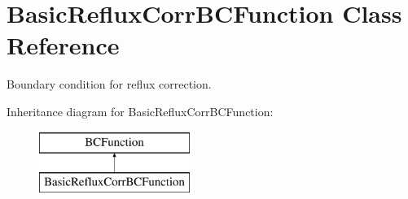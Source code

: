\hypertarget{class_basic_reflux_corr_b_c_function}{\section{Basic\-Reflux\-Corr\-B\-C\-Function Class Reference}
\label{class_basic_reflux_corr_b_c_function}
}


Boundary condition for reflux correction.  


Inheritance diagram for Basic\-Reflux\-Corr\-B\-C\-Function\-:\begin{figure}[H]
\begin{center}
\leavevmode
\includegraphics[height=2.000000cm]{class_basic_reflux_corr_b_c_function}
\end{center}
\end{figure}

